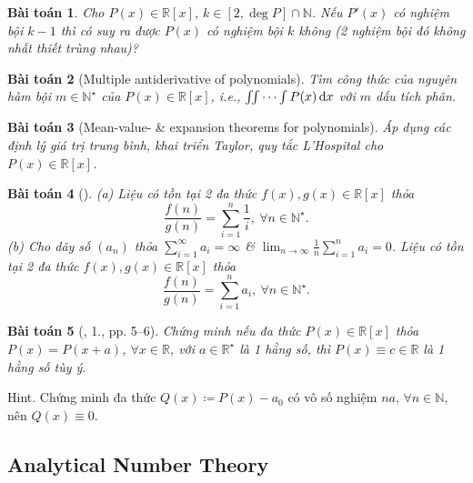 \documentclass{article}
\newtheorem{baitoan}{Bài toán}
\begin{document}
\begin{baitoan}
	Cho $P(x)\in\mathbb{R}[x]$, $k\in[2,\deg P]\cap\mathbb{N}$. Nếu $P'(x)$ có nghiệm bội $k - 1$ thì có suy ra được $P(x)$ có nghiệm bội $k$ không (2 nghiệm bội đó không nhất thiết trùng nhau)?
\end{baitoan}

\begin{baitoan}[Multiple antiderivative of polynomials]
	Tìm công thức của nguyên hàm bội $m\in\mathbb{N}^\star$ của $P(x)\in\mathbb{R}[x]$, i.e., $\iint\cdots\int P(x)\,{\rm d}x$ với $m$ dấu tích phân.
\end{baitoan}

\begin{baitoan}[Mean-value- \& expansion theorems for polynomials]
	Áp dụng các định lý giá trị trung bình, khai triển Taylor, quy tắc L'Hospital cho $P(x)\in\mathbb{R}[x]$.
\end{baitoan}

\begin{baitoan}[\cite{Quoc_Long_Dat_Nam_VMC}]
	(a) Liệu có tồn tại 2 đa thức $f(x),g(x)\in\mathbb{R}[x]$ thỏa
	\begin{equation*}
		\frac{f(n)}{g(n)} = \sum_{i=1}^n \frac{1}{i},\ \forall n\in\mathbb{N}^\star.
	\end{equation*}
	(b) Cho dãy số $(a_n)$ thỏa $\sum_{i=1}^\infty a_i = \infty$ \& $\lim_{n\to\infty} \frac{1}{n}\sum_{i=1}^n a_i = 0$. Liệu có tồn tại 2 đa thức $f(x),g(x)\in\mathbb{R}[x]$ thỏa
	\begin{equation*}
		\frac{f(n)}{g(n)} = \sum_{i=1}^n a_i,\ \forall n\in\mathbb{N}^\star.
	\end{equation*}
\end{baitoan}

\begin{baitoan}[\cite{Chung_pth_da_thuc}, 1., pp. 5--6]
	Chứng minh nếu đa thức $P(x)\in\mathbb{R}[x]$ thỏa $P(x) = P(x + a)$, $\forall x\in\mathbb{R}$, với $a\in\mathbb{R}^\star$ là 1 hằng số, thì $P(x)\equiv c\in\mathbb{R}$ là 1 hằng số tùy ý.
\end{baitoan}
{\sf Hint.} Chứng minh đa thức $Q(x)\coloneqq P(x) - a_0$ có vô số nghiệm $na$, $\forall n\in\mathbb{N}$, nên $Q(x)\equiv0$.


\subsection{Analytical Number Theory}
\end{document}
